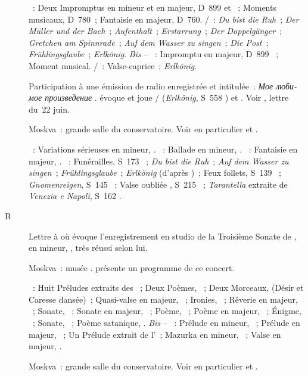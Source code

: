 \begin{description}
 \textsc{\Schubert{}}~: Deux Impromptus en \kC mineur et en \kA \Flat
 majeur, D~899  et ~; Moments musicaux, D~780~;
 Fantaisie  en \kC majeur, D~760.
 \textsc{\Schubert{}/\Liszt{}}~: \emph{Du bist die Ruh}~; \emph{Der Müller
 und der Bach}~; \emph{Aufenthalt}~; \emph{Erstarrung}~; \emph{Der
 Doppelgänger}~; \emph{Gretchen am Spinnrade}~; \emph{Auf dem Wasser zu
 singen}~; \emph{Die Post}~; \emph{Frühlingsglaube}~; \emph{Erlkönig}.
 \emph{Bis} -- \textsc{\Schubert{}}~: Impromptu en \kE \Flat majeur, D~899
 ~; Moment musical.
 \textsc{\Schubert{}/\Liszt{}}~: Valse-caprice~; \emph{Erlkönig}.
 \item[\DateWithWeekDay{1946-06-21}]
 Participation à une émission de radio enregistrée et intitulée~:
 \foreignlanguage{russian}{\emph{Мое любимое произведение}} .
 \VSofronitsky{} évoque et joue \Schubert{}/\Liszt{} (\emph{Erlkönig}, S~558
 ) et \Scriabine{}.
 Voir \citet[p.~167]{Nekrasova08}, lettre du~22 juin.
 \item[\DateWithWeekDay{1946-06-22}]
 Moskva~: grande salle du conservatoire.
 Voir en particulier \citet[p.~442]{Milshteyn82a} et
 \citet[p.~394-395]{Nikonovich08}.

 \textsc{\Mendelssohn{}}~: Variations sérieuses en \kD mineur, .
 \textsc{\Brahms{}}~: Ballade en \kG mineur,  .
 \textsc{\Schumann{}}~: Fantaisie en \kC majeur, .
 \textsc{\Liszt{}}~: Funérailles, S~173 ~; \emph{Du bist die
 Ruh}~; \emph{Auf dem Wasser zu singen}~; \emph{Frühlingsglaube}~;
 \emph{Erlkönig} (d'après \Schubert{})~; Feux follets, S~139 ~;
 \emph{Gnomenreigen}, S~145 ~; Valse oubliée , S~215
 ~; \emph{Tarantella} extraite de \emph{Venezia e Napoli}, S~162
 .
 \item[B\DateWithWeekDay{1946-08-15}]
 Lettre à \AVizel{} \citep[voir][p.~167-168]{Nekrasova08} où \VSofronitsky{}
 évoque l'enregistrement en studio de la Troisième Sonate de \Scriabine{},
 en \kF \Sharp mineur, , très réussi selon lui.
 \item[\DateWithWeekDay{1946-09-01}]
 Moskva~: musée \Scriabine{}.
 \citet{Lazarev20} présente un programme de ce concert.

 \textsc{\Scriabine{}}~: Huit Préludes extraits des ~; Deux Poèmes, ~; Deux Morceaux,  (Désir et
 Caresse dansée)~; Quasi-valse en \kF majeur, ~; Ironies, 
 ~; Rêverie en \kC majeur,  ~; Sonate,
 ~; Sonate en \kF \Sharp majeur, ~; Poème, 
 ~; Poème en \kF \Sharp majeur,  ~; Énigme,
  ~; Sonate, ~; Poème satanique, .
 \emph{Bis} -- \textsc{\Scriabine{}}~: Prélude en \kE mineur, 
 ~; Prélude en \kD majeur,  ~; Un Prélude
 extrait de l'~; Mazurka en \kE mineur,  ~;
 Valse en \kA \Flat majeur, .
 \item[\DateWithWeekDay{1946-10-25}]
 Moskva~: grande salle du conservatoire.
 Voir en particulier \citet[p.~442-443]{Milshteyn82a} et
 \citet[p.~395]{Nikonovich08}.


\end{description}
